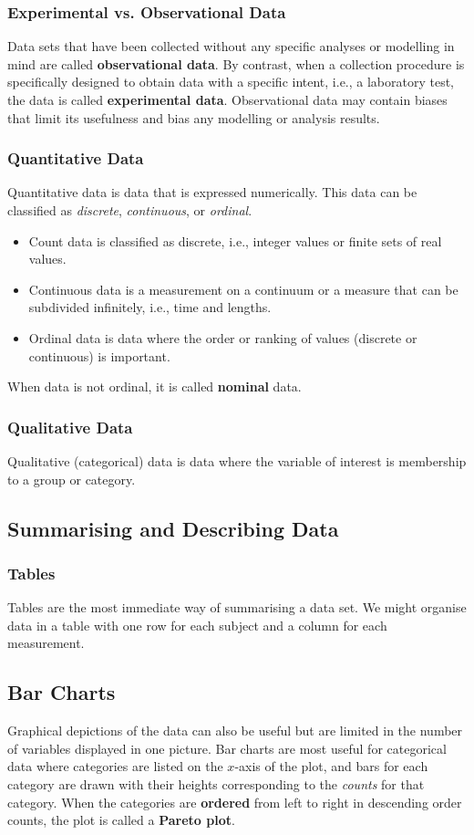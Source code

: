 \documentclass{article}
\begin{document}
\subsubsection{Experimental vs. Observational Data}
Data sets that have been collected without any specific analyses or
modelling in mind are called \textbf{observational data}. By contrast,
when a collection procedure is specifically designed to obtain data
with a specific intent, i.e., a laboratory test, the data is called
\textbf{experimental data}. Observational data may contain biases that
limit its usefulness and bias any modelling or analysis results.
\subsubsection{Quantitative Data}
Quantitative data is data that is expressed numerically. This data can
be classified as \textit{discrete}, \textit{continuous}, or
\textit{ordinal}.
\begin{itemize}
    \item Count data is classified as discrete, i.e., integer values or
          finite sets of real values.
    \item Continuous data is a measurement on a continuum or a measure
          that can be subdivided infinitely, i.e., time and lengths.
    \item Ordinal data is data where the order or ranking of values
          (discrete or continuous) is important.
\end{itemize}
When data is not ordinal, it is called \textbf{nominal} data.
\subsubsection{Qualitative Data}
Qualitative (categorical) data is data where the variable of interest
is membership to a group or category.
\subsection{Summarising and Describing Data}
\subsubsection{Tables}
Tables are the most immediate way of summarising a data set. We might
organise data in a table with one row for each subject and a column for
each measurement.
\subsection{Bar Charts}
Graphical depictions of the data can also be useful but are limited in
the number of variables displayed in one picture. Bar charts are most
useful for categorical data where categories are listed on the
\(x\)-axis of the plot, and bars for each category are drawn with their
heights corresponding to the \textit{counts} for that category. When
the categories are \textbf{ordered} from left to right in descending
order counts, the plot is called a \textbf{Pareto plot}.
\end{document}

